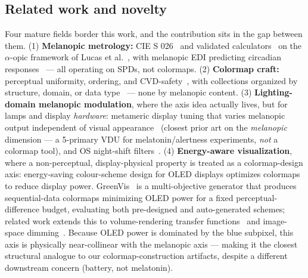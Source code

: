 \documentclass[10pt,a4paper,twocolumn]{article}
\begin{document}
\subsection{Related work and novelty}\label{sec:related-work}

Four mature fields border this work, and the contribution sits in the gap between them.
(1) \textbf{Melanopic metrology:} CIE S 026~\cite{cie_s026_2018} and validated calculators~\cite{spitschan2021luox} on the $\alpha$-opic framework of Lucas et al.~\cite{lucas2014melanopsin}, with melanopic EDI predicting circadian responses~\cite{brown2020melanopic} --- all operating on SPDs, not colormaps.
(2) \textbf{Colormap craft:} perceptual uniformity, ordering, and CVD-safety~\cite{smith2015viridis,nunez2018cividis,kovesi2015colourmaps,moreland2009diverging,crameri2020colour}, with collections organized by structure, domain, or data type~\cite{thyng2016cmocean,harrower2003colorbrewer} --- none by melanopic content.
(3) \textbf{Lighting-domain melanopic modulation}, where the axis idea actually lives, but for lamps and display \emph{hardware}: metameric display tuning that varies melanopic output independent of visual appearance~\cite{allen2018metamerism} (closest prior art on the \emph{melanopic} dimension --- a 5-primary VDU for melatonin/alertness experiments, \emph{not} a colormap tool), and OS night-shift filters~\cite{nagare2019nightshift}.
(4) \textbf{Energy-aware visualization}, where a non-perceptual, display-physical property is treated as a colormap-design axis: energy-saving colour-scheme design for OLED displays optimizes colormaps to reduce display power.
GreenVis~\cite{wang2012greenvis} is a multi-objective generator that produces sequential-data colormaps minimizing OLED power for a fixed perceptual-difference budget, evaluating both pre-designed and auto-generated schemes; related work extends this to volume-rendering transfer functions~\cite{chen2016volume} and image-space dimming~\cite{chen2014imagespace}.
Because OLED power is dominated by the blue subpixel, this axis is physically near-collinear with the melanopic axis --- making it the closest structural analogue to our colormap-construction artifacts, despite a different downstream concern (battery, not melatonin).
\end{document}
